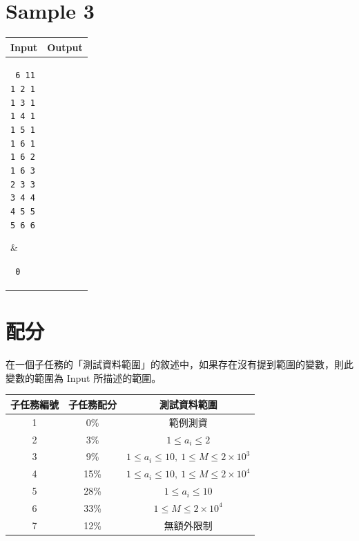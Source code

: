 \documentclass[11pt,a4paper]{article}
\begin{document}
\newpage
\section*{Sample 3}
\begin{longtable}[!h]{|p{}|p{}|}
\hline
\textbf {Input}	& \textbf {Output} \\
\hline
\parbox[t]{0.5\textwidth} %
{ \tt
6 11 \\
1 2 1 \\
1 3 1 \\
1 4 1 \\
1 5 1 \\
1 6 1 \\
1 6 2 \\
1 6 3 \\
2 3 3 \\
3 4 4 \\
4 5 5 \\
5 6 6 \\
} &
\parbox[t]{0.5\textwidth}
{ \tt
0 \\
} \\
\hline
\end{longtable}

\section*{配分}

在一個子任務的「測試資料範圍」的敘述中，如果存在沒有提到範圍的變數，則此變數的範圍為 Input 所描述的範圍。

\begin{center}
 \begin{tabular}{||c c c||} 
 \hline
 子任務編號 & 子任務配分 & 測試資料範圍 \\  
 \hline\hline
 1 & 0\% & 範例測資 \\ 
 \hline
 2 & 3\% & $1 \le a_i \le 2$ \\
 \hline
 3 & 9\% & $1 \le a_i \le 10,\ 1 \le M \le 2\times 10^3$ \\
 \hline
 4 & 15\% & $1 \le a_i \le 10,\ 1 \le M \le 2\times 10^4$ \\
 \hline
 5 & 28\% & $1 \le a_i \le 10$ \\
 \hline
 6 & 33\% & $1 \le M \le 2\times 10^4$ \\
 \hline
 7 & 12\% & 無額外限制 \\ 
 \hline
\end{tabular}
\end{center}
\end{document}
